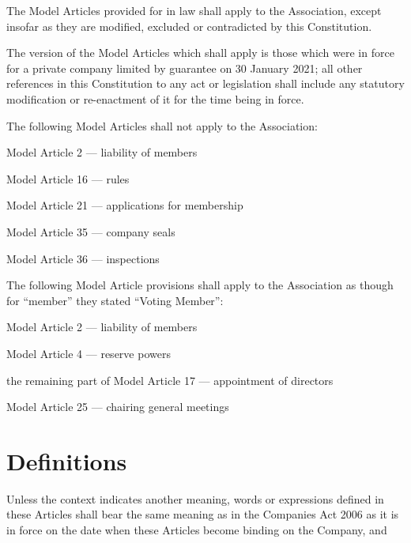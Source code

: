 \documentclass[10pt]{mk-articles-of-association}
\begin{document}
\begin{constenum}

\item The Model Articles provided for in law shall apply to the
  Association, except insofar as they are modified, excluded or
  contradicted by this Constitution.

\item The version of the Model Articles which shall apply is those
  which were in force for a private company limited by guarantee on
  30 January 2021; all other references in this Constitution
  to any act or legislation shall include any statutory modification
  or re-enactment of it for the time being in force.

\item The following Model Articles shall not apply to the Association:
  \begin{constenum}
  \item Model Article 2 --- liability of members
  \item Model Article 16 --- rules
  \item Model Article 21 --- applications for membership
  \item Model Article 35 --- company seals
  \item Model Article 36 --- inspections
  \end{constenum}

\item The following Model Article provisions shall apply to the Association
  as though for ``member'' they stated ``Voting Member'':

  \begin{constenum}
  \item Model Article 2 --- liability of members
  \item Model Article 4 --- reserve powers
  \item the remaining part of Model Article 17 --- appointment of directors
  \item Model Article 25 --- chairing general meetings
  \end{constenum}

\end{constenum}

\section{Definitions}

Unless the context indicates another meaning, words or expressions
defined in these Articles shall bear the same meaning as in the
Companies Act 2006 as it is in force on the date when these Articles
become binding on the Company, and
\end{document}
